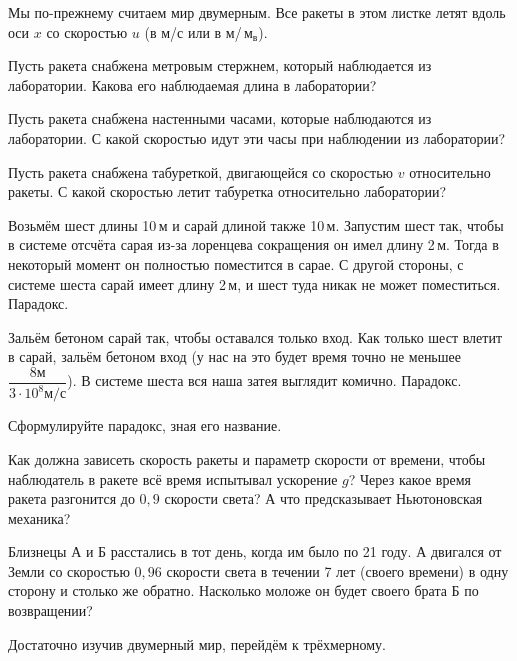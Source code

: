 \documentclass[a4paper,12pt]{article}
\newcommand{\мв}{\,м$_в$}
\begin{document}

{\small Мы по-прежнему считаем мир двумерным. Все ракеты в этом листке летят вдоль оси $x$ со скоростью $u$ (в м/с или в м/\мв).

}


\qquad
Пусть ракета снабжена метровым стержнем, который наблюдается из лаборатории.
Какова его наблюдаемая длина в лаборатории?

\qquad
Пусть ракета снабжена настенными часами, которые наблюдаются из лаборатории.
С какой скоростью идут эти часы при наблюдении из лаборатории?

\qquad
Пусть ракета снабжена табуреткой, двигающейся со скоростью $v$ относительно ракеты. С какой скоростью летит табуретка относительно лаборатории?

\qquad
Возьмём шест длины 10\,м и сарай длиной также 10\,м. Запустим шест так, чтобы в системе отсчёта сарая из-за лоренцева сокращения он имел длину 2\,м. Тогда в некоторый момент он полностью поместится в сарае. С другой стороны, с системе шеста сарай имеет длину 2\,м, и шест туда никак не может поместиться. Парадокс.


\qquad
Зальём бетоном сарай так, чтобы оставался только вход. Как только шест влетит в сарай, зальём бетоном вход (у нас на это будет время точно не меньшее $\dfrac{8м}{3\cdot10^8 м/с}$). В системе шеста вся наша затея выглядит комично. Парадокс.

\qquad
Сформулируйте парадокс, зная его название.


\qquad
Как должна зависеть скорость ракеты и параметр скорости от времени, чтобы наблюдатель в ракете всё время испытывал ускорение $g$? Через какое время ракета разгонится до $0{,}9$ скорости света? А что предсказывает Ньютоновская механика?

\qquad
Близнецы А и Б расстались в тот день, когда им было по 21 году. А двигался от Земли со скоростью $0{,}96$ скорости света в течении 7 лет (своего времени) в одну сторону и столько же обратно. Насколько моложе он будет своего брата Б по возвращении?



Достаточно изучив двумерный мир, перейдём к трёхмерному.
\end{document}
